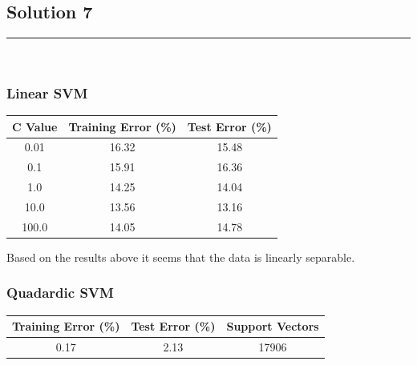 \documentclass{article}
\begin{document}
\newpage

\subsection*{Solution 7}
\noindent\rule{\textwidth}{0.4pt}\\

\subsubsection*{Linear SVM}

\begin{center} 
  \begin{tabular}{|c|c|c|} 
    \hline C Value & Training Error (\%) & Test Error (\%) \\ 
    \hline 
    0.01 & 16.32 & 15.48\\ 
    0.1 & 15.91 & 16.36 \\
    1.0 & 14.25 & 14.04 \\
    10.0 & 13.56 & 13.16 \\ 
    100.0 & 14.05 & 14.78 \\ 
    \hline
  \end{tabular}
\end{center}
\parbox{\textwidth}{Based on the results above it seems that the data is linearly separable.}
\subsubsection*{Quadardic SVM}
\begin{center} 
  \begin{tabular}{|c|c|c|} 
    \hline Training Error (\%) & Test Error (\%)  & Support Vectors\\ 
    \hline 
    0.17 & 2.13 & 17906\\ 
    \hline
  \end{tabular}
\end{center}
\end{document}
